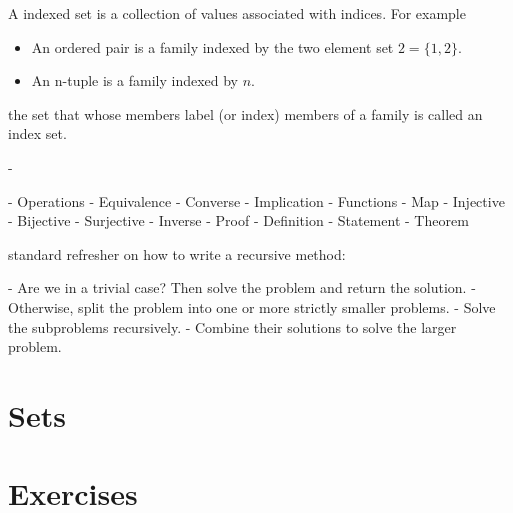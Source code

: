 A indexed set is a collection of values associated with indices. For example
\begin{itemize}
\item An ordered pair is a family indexed by the two element set $2 = \{1, 2\}$.
\item An n-tuple is a family indexed by $n$.
\end{itemize}
the set that whose members label (or index) members of a family is called an index set. 

- 


- Operations
    - Equivalence
    - Converse
    - Implication
- Functions
    - Map
    - Injective
    - Bijective
    - Surjective
    - Inverse
- Proof
    - Definition
    - Statement
    - Theorem


standard refresher on how to write a recursive method:

- Are we in a trivial case? Then solve the problem and return the solution.
- Otherwise, split the problem into one or more strictly smaller problems.
- Solve the subproblems recursively.
- Combine their solutions to solve the larger problem.

\section{Sets}


\section{Exercises}
\begin{ExerciseList}
\end{ExerciseList}
